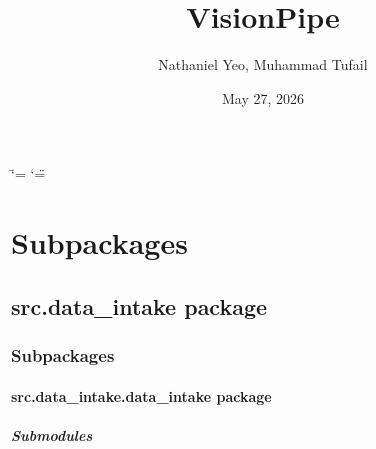 \documentclass[letterpaper,10pt,english]{sphinxmanual}
\title{VisionPipe}
\date{May 27, 2026}
\author{Nathaniel Yeo, Muhammad Tufail}
\begin{document}
\ifdefined\shorthandoff
  \ifnum\catcode`\=\string=\active\shorthandoff{=}\fi
  \ifnum\catcode`\"=\active{}\fi
\fi

\pagestyle{empty}
\sphinxmaketitle
\pagestyle{plain}
\sphinxtableofcontents
\pagestyle{normal}
\label{\detokenize{index::doc}}
\sphinxstepscope



\chapter{Subpackages}
\label{\detokenize{modules/src:subpackages}}
\sphinxstepscope


\section{src.data\_intake package}
\label{\detokenize{modules/src.data_intake:module-src.data_intake}}\label{\detokenize{modules/src.data_intake:src-data-intake-package}}\label{\detokenize{modules/src.data_intake::doc}}

\subsection{Subpackages}
\label{\detokenize{modules/src.data_intake:subpackages}}
\sphinxstepscope


\subsubsection{src.data\_intake.data\_intake package}
\label{\detokenize{modules/src.data_intake.data_intake:module-src.data_intake.data_intake}}\label{\detokenize{modules/src.data_intake.data_intake:src-data-intake-data-intake-package}}\label{\detokenize{modules/src.data_intake.data_intake::doc}}

\paragraph{Submodules}
\label{\detokenize{modules/src.data_intake.data_intake:submodules}}
\sphinxstepscope
\end{document}

